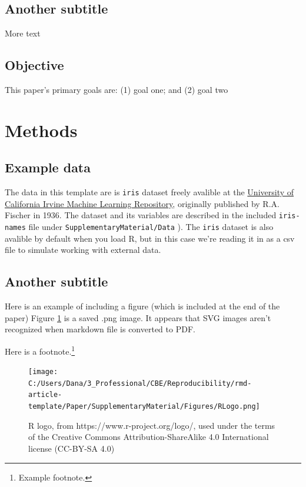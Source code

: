 \documentclass[]{elsarticle} %
\begin{document}
\subsection{Another subtitle}\label{another-subtitle}

More text

\subsection{Objective}\label{objective}

This paper's primary goals are: (1) goal one; and (2) goal two

\section{Methods}\label{methods}

\subsection{Example data}\label{example-data}

The data in this template are is \texttt{iris} dataset freely avalible
at the \href{https://archive.ics.uci.edu/ml/datasets/iris}{University of
California Irvine Machine Learning Repository}, originally published by
R.A. Fischer in 1936. The dataset and its variables are described in the
included \texttt{iris-names} file under
\texttt{SupplementaryMaterial/Data} ). The \texttt{iris} dataset is also
avalible by default when you load R, but in this case we're reading it
in as a csv file to simulate working with external data.

\subsection{Another subtitle}\label{another-subtitle-1}

Here is an example of including a figure (which is included at the end
of the paper) Figure \ref{fig:experimentimage} is a saved .png image. It
appears that SVG images aren't recognized when markdown file is
converted to PDF.

Here is a footnote.\footnote{Example footnote.}

\begin{figure}
\centering
\texttt{[image: C:/Users/Dana/3\_Professional/CBE/Reproducibility/rmd-article-template/Paper/SupplementaryMaterial/Figures/RLogo.png]}
\caption{\label{fig:experimentimage}R logo, from
https://www.r-project.org/logo/, used under the terms of the Creative
Commons Attribution-ShareAlike 4.0 International license (CC-BY-SA 4.0)}
\end{figure}
\end{document}
